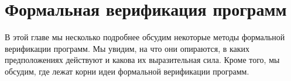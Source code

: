 \section{Формальная верификация программ}

В этой главе мы несколько подробнее обсудим некоторые методы формальной верификации программ. Мы увидим, на что они опираются, в каких предположениях действуют и какова их выразительная сила. Кроме того, мы обсудим, где лежат корни идеи формальной верификации программ.




